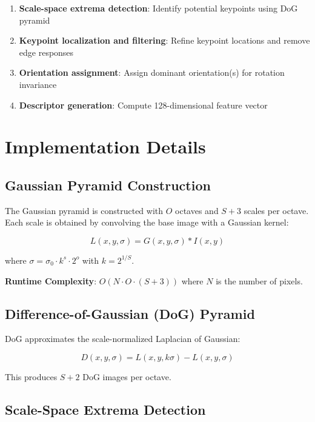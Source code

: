\documentclass[11pt, a4paper]{article}
\begin{document}
\begin{enumerate}
    \item \textbf{Scale-space extrema detection}: Identify potential keypoints using DoG pyramid
    \item \textbf{Keypoint localization and filtering}: Refine keypoint locations and remove edge responses
    \item \textbf{Orientation assignment}: Assign dominant orientation(s) for rotation invariance
    \item \textbf{Descriptor generation}: Compute 128-dimensional feature vector
\end{enumerate}

\section{Implementation Details}

\subsection{Gaussian Pyramid Construction}

The Gaussian pyramid is constructed with $O$ octaves and $S+3$ scales per octave. Each scale is obtained by convolving the base image with a Gaussian kernel:

\begin{equation}
L(x, y, \sigma) = G(x, y, \sigma) * I(x, y)
\end{equation}

where $\sigma = \sigma_0 \cdot k^s \cdot 2^o$ with $k = 2^{1/S}$.

\textbf{Runtime Complexity}: $O(N \cdot O \cdot (S+3))$ where $N$ is the number of pixels.

\subsection{Difference-of-Gaussian (DoG) Pyramid}

DoG approximates the scale-normalized Laplacian of Gaussian:

\begin{equation}
D(x, y, \sigma) = L(x, y, k\sigma) - L(x, y, \sigma)
\end{equation}

This produces $S+2$ DoG images per octave.

\subsection{Scale-Space Extrema Detection}
\end{document}
